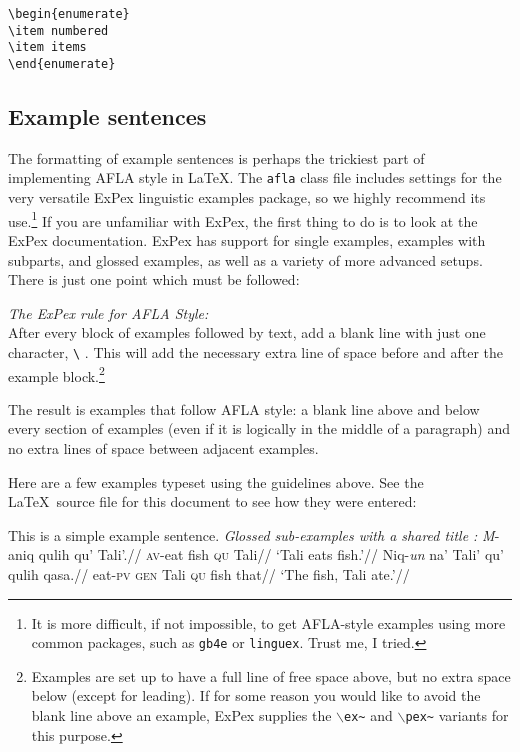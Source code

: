 \documentclass{afla}
\begin{document}
\ex \verb`\begin{enumerate}`\\
	\verb`\item numbered`\\
	\verb`\item items`\\
	\verb`\end{enumerate}`
\xe

\subsection{Example sentences}

The formatting of example sentences is perhaps the trickiest part of implementing AFLA style in \LaTeX. The \verb`afla` class file includes settings for the very versatile ExPex linguistic examples package, so we highly recommend its use.\footnote{It is more difficult, if not impossible, to get AFLA-style examples using more common packages, such as \texttt{gb4e} or \texttt{linguex}. Trust me, I tried.} If you are unfamiliar with ExPex, the first thing to do is to look at the ExPex documentation. ExPex has support for single examples, examples with subparts, and glossed examples, as well as a variety of more advanced setups. There is just one point which must be followed:

\ex \textit{The ExPex rule for AFLA Style:}\\
	After every block of examples followed by text, add a blank line with just one character, \verb`\` . This will add the necessary extra line of space before and after the example block.\footnote{Examples are set up to have a full line of free space above, but no extra space below (except for leading). If for some reason you would like to avoid the blank line above an example, ExPex supplies the $\backslash$\texttt{ex\~} and $\backslash$\texttt{pex\~} variants for this purpose.}
\xe
\

\noindent The result is examples that follow AFLA style: a blank line above and below every section of examples (even if it is logically in the middle of a paragraph) and no extra lines of space between adjacent examples.

Here are a few examples typeset using the guidelines above. See the \LaTeX\ source file for this document to see how they were entered:

\ex This is a simple example sentence.
\xe
\pex\textit{Glossed sub-examples with a shared title \citep[examples from][]{liu2004}:}
\a	\begingl
	\gla {}\textit{M}-aniq qulih qu' Tali'.//
	\glb \textsc{av}-eat fish \textsc{qu} Tali//
	\glft `Tali eats fish.'//
	\endgl
\a	\begingl
	\gla {}Niq-\textit{un} na' Tali' qu' qulih qasa.//
	\glb eat-\textsc{pv} \textsc{gen} Tali \textsc{qu} fish that//
	\glft `The fish, Tali ate.'//
	\endgl
\xe
\
\end{document}
